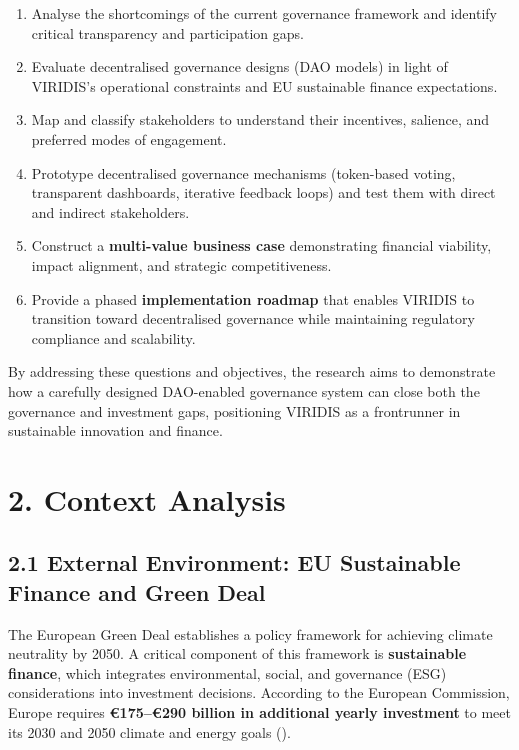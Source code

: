 \documentclass[
  english,
  12pt,
  oneside,
  open=any]{scrbook}
\providecommand{\tightlist}{%
  \setlength{\itemsep}{0pt}\setlength{\parskip}{0pt}}\usepackage{longtable,booktabs,array}
\begin{document}
\begin{enumerate}
\def\labelenumi{\arabic{enumi}.}
\tightlist
\item
  Analyse the shortcomings of the current governance framework and
  identify critical transparency and participation gaps.\\
\item
  Evaluate decentralised governance designs (DAO models) in light of
  VIRIDIS's operational constraints and EU sustainable finance
  expectations.\\
\item
  Map and classify stakeholders to understand their incentives,
  salience, and preferred modes of engagement.\\
\item
  Prototype decentralised governance mechanisms (token-based voting,
  transparent dashboards, iterative feedback loops) and test them with
  direct and indirect stakeholders.\\
\item
  Construct a \textbf{multi-value business case} demonstrating financial
  viability, impact alignment, and strategic competitiveness.\\
\item
  Provide a phased \textbf{implementation roadmap} that enables VIRIDIS
  to transition toward decentralised governance while maintaining
  regulatory compliance and scalability.
\end{enumerate}

By addressing these questions and objectives, the research aims to
demonstrate how a carefully designed DAO-enabled governance system can
close both the governance and investment gaps, positioning VIRIDIS as a
frontrunner in sustainable innovation and finance.

\chapter{2. Context Analysis}\label{sec-context-analysis}

\section{2.1 External Environment: EU Sustainable Finance and Green
Deal}\label{sec-eu}

The European Green Deal establishes a policy framework for achieving
climate neutrality by 2050. A critical component of this framework is
\textbf{sustainable finance}, which integrates environmental, social,
and governance (ESG) considerations into investment decisions. According
to the European Commission, Europe requires \textbf{€175--€290 billion
in additional yearly investment} to meet its 2030 and 2050 climate and
energy goals
().
\end{document}
